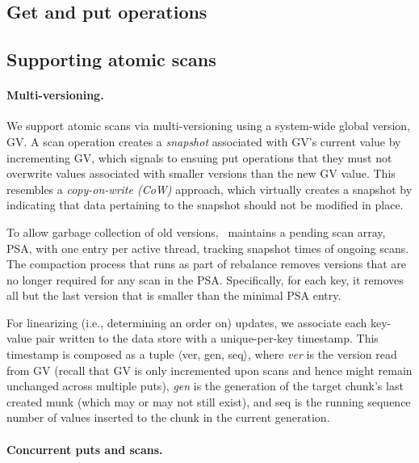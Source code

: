 \subsection{Get and put operations}
\label{ssec:ops}




\subsection{Supporting atomic scans}
\label{ssec:scans}


\paragraph{Multi-versioning.}

We support atomic scans via multi-versioning using a system-wide global version, GV. 
A scan operation creates a \emph{snapshot} associated with GV's current value by incrementing GV, 
which signals to ensuing put operations that they must not overwrite values associated with 
smaller versions than the new GV value.
This resembles a \emph{copy-on-write (CoW)} approach, which virtually creates a snapshot by 
indicating that data pertaining to the snapshot should not be modified in place.  

To allow garbage collection of old versions, \sys\  maintains 
a pending scan array, PSA, with one entry per active thread, tracking snapshot times of ongoing scans.
The compaction process that runs as part of rebalance removes versions that are no longer required for any  
scan in the PSA. Specifically, for each key, it removes all but the last version that is smaller than the minimal
PSA entry. 

For linearizing (i.e., determining an order on) updates, we associate each key-value pair written to the data store 
with a unique-per-key timestamp.
This timestamp is composed as a tuple $\langle$ver, gen, seq$\rangle$, where \emph{ver} is  the version read from GV 
(recall that GV is only incremented upon scans and hence might remain unchanged across multiple puts),
\emph{gen} is the generation of the target chunk's last created munk  (which may or may not still exist), 
and seq is the running sequence number of values inserted to the chunk in the current generation.

\paragraph{Concurrent puts and scans.}

